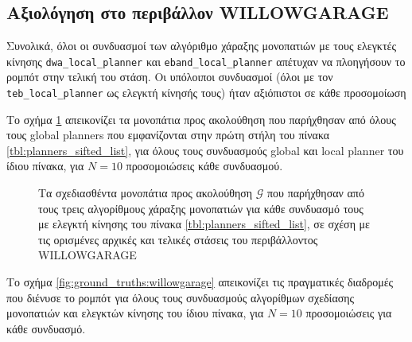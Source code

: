 \subsection{Αξιολόγηση στο περιβάλλον WILLOWGARAGE}
  \label{subsection:02_01_04:03}

Συνολικά, όλοι οι συνδυασμοί των αλγόριθμο χάραξης μονοπατιών με τους
ελεγκτές κίνησης \texttt{dwa\_local\_planner} και \texttt{eband\_local\_planner}
απέτυχαν να πλοηγήσουν το ρομπότ στην τελική του στάση. Οι υπόλοιποι συνδυασμοί
(όλοι με τον \texttt{teb\_local\_planner} ως ελεγκτή κίνησής τους) ήταν
αξιόπιστοι σε κάθε προσομοίωση

Το σχήμα \ref{fig:global_plans:willowgarage} απεικονίζει τα μονοπάτια προς
ακολούθηση που παρήχθησαν από όλους τους global planners που εμφανίζονται στην
πρώτη στήλη του πίνακα \ref{tbl:planners_sifted_list}, για όλους τους
συνδυασμούς global και local planner του ίδιου πίνακα, για $N=10$ προσομοιώσεις
κάθε συνδυασμού.

\begin{figure}
\raggedright
  \begin{subfigure}[t]{\linewidth}
    \centering
    
  \end{subfigure}%
  \vspace{-1.5cm}
  \begin{subfigure}[t]{\linewidth}
    \centering
    
  \end{subfigure}%
  \vspace{-1.5cm}
  \begin{subfigure}[t]{\linewidth}
    \centering
    
  \end{subfigure}%
  \caption{\small Τα σχεδιασθέντα μονοπάτια προς ακολούθηση $\bm{\mathcal{G}}$
           που παρήχθησαν από τους τρεις αλγορίθμους χάραξης μονοπατιών για
           κάθε συνδυασμό τους με ελεγκτή κίνησης του πίνακα
           \ref{tbl:planners_sifted_list}, σε σχέση με τις ορισμένες αρχικές και
           τελικές στάσεις του περιβάλλοντος WILLOWGARAGE}
  \label{fig:global_plans:willowgarage}
\end{figure}

Το σχήμα \ref{fig:ground_truths:willowgarage} απεικονίζει τις πραγματικές
διαδρομές που διένυσε το ρομπότ για όλους τους συνδυασμούς αλγορίθμων σχεδίασης
μονοπατιών και ελεγκτών κίνησης του ίδιου πίνακα, για $N=10$ προσομοιώσεις για
κάθε συνδυασμό.

